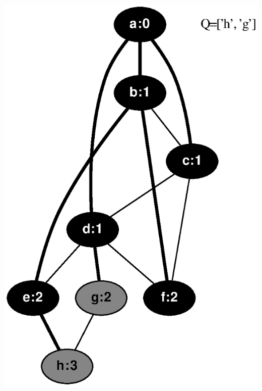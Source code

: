 \documentclass{article}
\begin{document}
\includegraphics[height=.3\textheight]{bfs_undirected_classroom_key_06.eps}
\vspace{1em}
\end{document}
